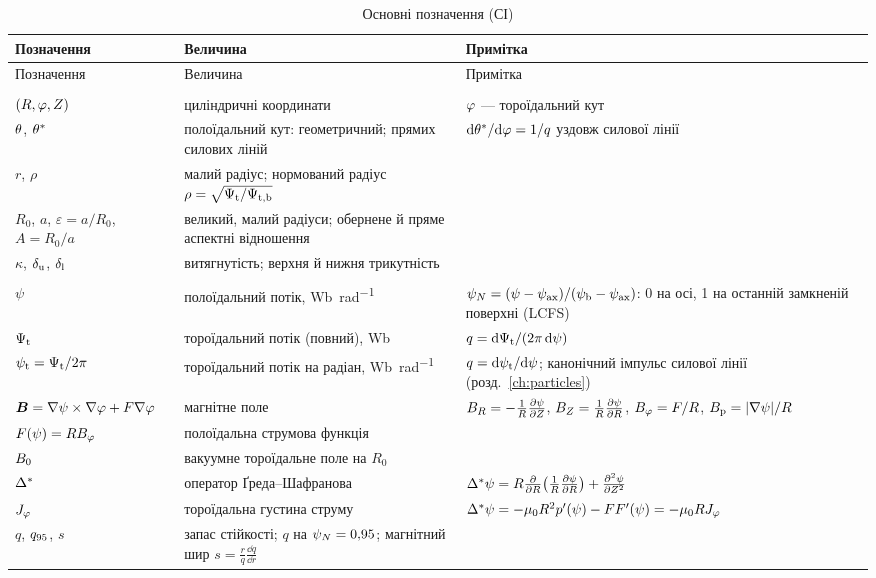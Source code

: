 \begin{longtable}{@{}>{\raggedright\arraybackslash}p{3.7cm}>{\raggedright\arraybackslash}p{6.6cm}>{\raggedright\arraybackslash}p{5.6cm}@{}}
\caption{Основні позначення (СІ)}\label{tab:notation}\\
\toprule
Позначення & Величина & Примітка \\
\midrule
\endfirsthead
\toprule
Позначення & Величина & Примітка \\
\midrule
\endhead
\bottomrule
\endfoot
\multicolumn{3}{@{}l}{\emph{Координати}}\\*
$(R,\varphi,Z)$ & циліндричні координати & $\varphi$ --- тороїдальний кут \\
$\theta$, $\theta^{*}$ & полоїдальний кут: геометричний; прямих силових ліній & $\mathrm{d}\theta^{*}/\mathrm{d}\varphi = 1/q$ уздовж силової лінії \\
$r$, $\rho$ & малий радіус; нормований радіус $\rho=\sqrt{\Psi_{\mathrm{t}}/\Psi_{\mathrm{t,b}}}$ & \\
$R_0$, $a$, $\varepsilon=a/R_0$, $A=R_0/a$ & великий, малий радіуси; обернене й пряме аспектні відношення & \\
$\kappa$, $\delta_{\mathrm{u}}$, $\delta_{\mathrm{l}}$ & витягнутість; верхня й нижня трикутність & \\
\multicolumn{3}{@{}l}{\emph{Магнітна конфігурація}}\\*
$\psi$ & полоїдальний потік, \si{\weber\per\radian} & $\psi_{N}=(\psi-\psi_{\mathrm{ax}})/(\psi_{\mathrm{b}}-\psi_{\mathrm{ax}})$: 0 на осі, 1 на останній замкненій поверхні (LCFS) \\
$\Psi_{\mathrm{t}}$ & тороїдальний потік (повний), \si{\weber} & $q=\mathrm{d}\Psi_{\mathrm{t}}/(2\pi\,\mathrm{d}\psi)$ \\
$\psi_{\mathrm{t}}=\Psi_{\mathrm{t}}/2\pi$ & тороїдальний потік на радіан, \si{\weber\per\radian} & $q=\mathrm{d}\psi_{\mathrm{t}}/\mathrm{d}\psi$; канонічний імпульс силової лінії (розд.~\ref{ch:particles}) \\
$\bm{B}=\nabla\psi\times\nabla\varphi+F\nabla\varphi$ & магнітне поле & $B_{R}=-\frac1R\frac{\partial\psi}{\partial Z}$, $B_{Z}=\frac1R\frac{\partial\psi}{\partial R}$, $B_{\varphi}=F/R$, $B_{\mathrm{p}}=|\nabla\psi|/R$ \\
$F(\psi)=RB_{\varphi}$ & полоїдальна струмова функція & \\
$B_{0}$ & вакуумне тороїдальне поле на $R_0$ & \\
$\Delta^{*}$ & оператор Ґреда--Шафранова & $\Delta^{*}\psi=R\frac{\partial}{\partial R}\bigl(\frac1R\frac{\partial\psi}{\partial R}\bigr)+\frac{\partial^2\psi}{\partial Z^2}$ \\
$J_{\varphi}$ & тороїдальна густина струму & $\Delta^{*}\psi=-\mu_0R^2p'(\psi)-FF'(\psi)=-\mu_0RJ_{\varphi}$ \\
$q$, $q_{95}$, $s$ & запас стійкості; $q$ на $\psi_{N}=0{,}95$; магнітний шир $s=\frac rq\frac{\dd q}{\dd r}$ & \\

\end{longtable}
